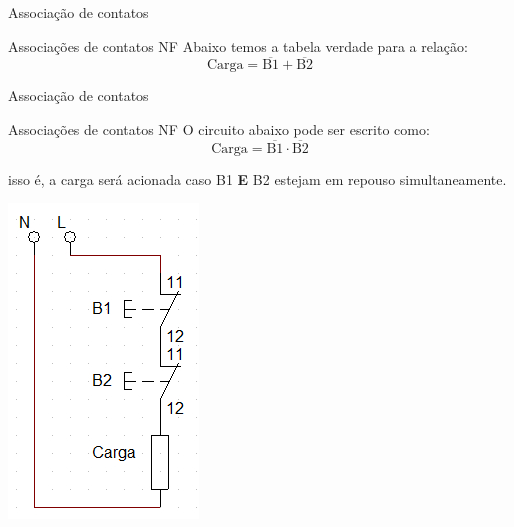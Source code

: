 \begin{frame}{Associação de contatos}
\begin{block}{Associações de contatos NF}
Abaixo temos a tabela verdade para a relação:
$$ \text{Carga} = \overline{\text{B}1}+\overline{\text{B}2} $$
\end{block}

\vspace{0.3cm}

\begin{table}[h]
\end{table}

\end{frame}


\begin{frame}{Associação de contatos}
\begin{block}{Associações de contatos NF}
O circuito abaixo pode ser escrito como:
$$ \text{Carga} = \overline{\text{B}1}\cdot\overline{\text{B}2} $$

isso é, a carga será acionada caso B1 \textbf{E} B2 estejam em repouso simultaneamente.
\end{block}

\centerline{\includegraphics[height=0.5\textheight]{Figuras/Ch06/fig7.jpg}}
\end{frame}

